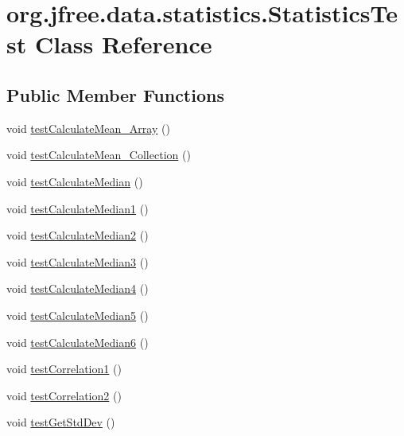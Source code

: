 \hypertarget{classorg_1_1jfree_1_1data_1_1statistics_1_1_statistics_test}{}\section{org.\+jfree.\+data.\+statistics.\+Statistics\+Test Class Reference}
\label{classorg_1_1jfree_1_1data_1_1statistics_1_1_statistics_test}
\subsection*{Public Member Functions}
\begin{DoxyCompactItemize}
\item 
void \mbox{\hyperlink{classorg_1_1jfree_1_1data_1_1statistics_1_1_statistics_test_a7f161805610c2530b0ddceac83f41d88}{test\+Calculate\+Mean\+\_\+\+Array}} ()
\item 
void \mbox{\hyperlink{classorg_1_1jfree_1_1data_1_1statistics_1_1_statistics_test_acc10a1f04e558aefc2005038f557b0e8}{test\+Calculate\+Mean\+\_\+\+Collection}} ()
\item 
void \mbox{\hyperlink{classorg_1_1jfree_1_1data_1_1statistics_1_1_statistics_test_a9be0c3a66ee6e692fff49c8c6e504d3b}{test\+Calculate\+Median}} ()
\item 
void \mbox{\hyperlink{classorg_1_1jfree_1_1data_1_1statistics_1_1_statistics_test_a9295c922d4d7ba8bab6d6770e4959576}{test\+Calculate\+Median1}} ()
\item 
void \mbox{\hyperlink{classorg_1_1jfree_1_1data_1_1statistics_1_1_statistics_test_a3b9d90e8e62673589932d9addc9dc229}{test\+Calculate\+Median2}} ()
\item 
void \mbox{\hyperlink{classorg_1_1jfree_1_1data_1_1statistics_1_1_statistics_test_ae2ad6ea7c0e4a10c1e71360c8ddefbc7}{test\+Calculate\+Median3}} ()
\item 
void \mbox{\hyperlink{classorg_1_1jfree_1_1data_1_1statistics_1_1_statistics_test_a11cebc8cd417466ab52ea163e9e42ce2}{test\+Calculate\+Median4}} ()
\item 
void \mbox{\hyperlink{classorg_1_1jfree_1_1data_1_1statistics_1_1_statistics_test_a1bbc1d1117119ff837537737b2f4ecd9}{test\+Calculate\+Median5}} ()
\item 
void \mbox{\hyperlink{classorg_1_1jfree_1_1data_1_1statistics_1_1_statistics_test_af2c5e1651ef5fab8c3b7beb10f9b5ac5}{test\+Calculate\+Median6}} ()
\item 
void \mbox{\hyperlink{classorg_1_1jfree_1_1data_1_1statistics_1_1_statistics_test_a92fa6e119784c5f2298cd432e1055dae}{test\+Correlation1}} ()
\item 
void \mbox{\hyperlink{classorg_1_1jfree_1_1data_1_1statistics_1_1_statistics_test_ae7923f4de3918523314715339ab2c577}{test\+Correlation2}} ()
\item 
void \mbox{\hyperlink{classorg_1_1jfree_1_1data_1_1statistics_1_1_statistics_test_a2531f8b95459797c0b383c824268d476}{test\+Get\+Std\+Dev}} ()
\end{DoxyCompactItemize}


